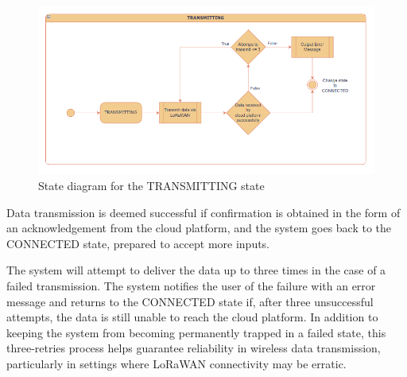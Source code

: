 \begin{figure}[H]
	\centering
	\includegraphics[width=\textwidth]{diagrams/states_transmitting}
	\caption{State diagram for the TRANSMITTING state}
	\label{fig:states_transmitting}
\end{figure}

Data transmission is deemed successful if confirmation is obtained in the form of an acknowledgement from the cloud platform, and the system goes back to the CONNECTED state, prepared to accept more inputs.

The system will attempt to deliver the data up to three times in the case of a failed transmission. The system notifies the user of the failure with an error message and returns to the CONNECTED state if, after three unsuccessful attempts, the data is still unable to reach the cloud platform. In addition to keeping the system from becoming permanently trapped in a failed state, this three-retries process helps guarantee reliability in wireless data transmission, particularly in settings where LoRaWAN connectivity may be erratic.

